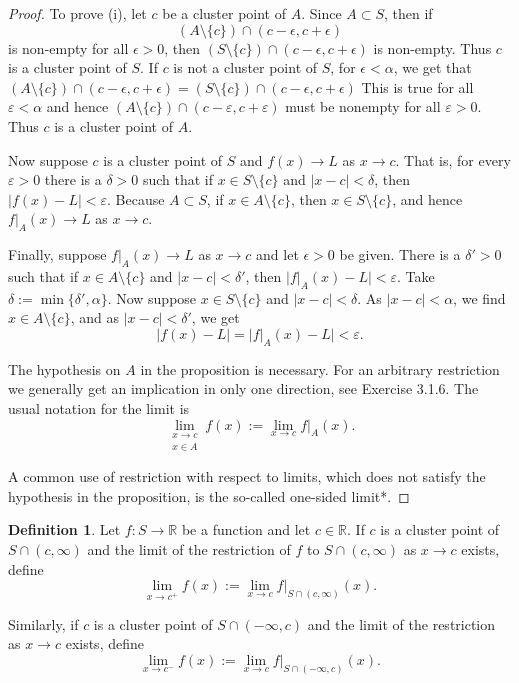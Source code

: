 \documentclass{article}
\theoremstyle{definition}
\newtheorem{defi}{Definition}[section]
\begin{document}
\begin{proof}
To prove (i), let $c$ be a cluster point of $A$. Since $A\subset S$, then if \[ (A \setminus \{c\}) \cap (c - \epsilon, c + \epsilon)\] is non-empty 
for all $\epsilon >0$, then $(S \setminus \{c\}) \cap (c - \epsilon, c + \epsilon)$ is non-empty. Thus $c$ is a cluster point of $S$. If $c$ is not a cluster point of $S$, 
for $\epsilon<\alpha$, we get that $(A \setminus \{c\}) \cap (c - \epsilon, c + \epsilon) = (S \setminus \{c\}) \cap (c - \epsilon, c + \epsilon)$
This is true for all \(\varepsilon < \alpha\) and hence \((A \setminus \{c\}) \cap (c - \varepsilon, c + \varepsilon)\) must be nonempty for all \(\varepsilon > 0\). Thus \(c\) is a cluster point of \(A\).

Now suppose \(c\) is a cluster point of \(S\) and \(f(x) \rightarrow L\) as \(x \rightarrow c\). That is, for every \(\varepsilon > 0\) there is a \(\delta > 0\) such that if \(x \in S \setminus \{c\}\) and \(|x - c| < \delta\), then \(|f(x) - L| < \varepsilon\). Because \(A \subset S\), if \(x \in A \setminus \{c\}\), then \(x \in S \setminus \{c\}\), and hence \(f|_A(x) \rightarrow L\) as \(x \rightarrow c\).

Finally, suppose \(f|_A(x) \rightarrow L\) as \(x \rightarrow c\) and let \(\epsilon > 0\) be given. There is a \(\delta' > 0\) such that if \(x \in A \setminus \{c\}\) and \(|x - c| < \delta'\), then \(|f|_A(x) - L| < \varepsilon\). Take \(\delta := \min\{\delta', \alpha\}\). Now suppose \(x \in S \setminus \{c\}\) and \(|x - c| < \delta\). As \(|x - c| < \alpha\), we find \(x \in A \setminus \{c\}\), and as \(|x - c| < \delta'\), we get
\[ |f(x) - L| = |f|_A(x) - L| < \varepsilon. \]

The hypothesis on \(A\) in the proposition is necessary. For an arbitrary restriction we generally get an implication in only one direction, see Exercise 3.1.6. The usual notation for the limit is
\[ \lim_{\substack{x \rightarrow c \\ x \in A}} f(x) := \lim_{x \rightarrow c} f|_A(x). \]

A common use of restriction with respect to limits, which does not satisfy the hypothesis in the proposition, is the so-called one-sided limit*.
\end{proof}

\begin{defi}
    Let \( f: S \rightarrow \mathbb{R} \) be a function and let \( c \in \mathbb{R} \). If \( c \) is a cluster point of \( S \cap (c, \infty) \) and the limit of the restriction of \( f \) to \( S \cap (c, \infty) \) as \( x \rightarrow c \) exists, define
    \[ \lim_{x \to c^+} f(x) := \lim_{x \to c} f|_{S \cap (c, \infty)}(x). \]
    
    Similarly, if \( c \) is a cluster point of \( S \cap (-\infty, c) \) and the limit of the restriction as \( x \rightarrow c \) exists, define
    \[ \lim_{x \to c^-} f(x) := \lim_{x \to c} f|_{S \cap (-\infty, c)}(x). \]    
\end{defi}
\end{document}
